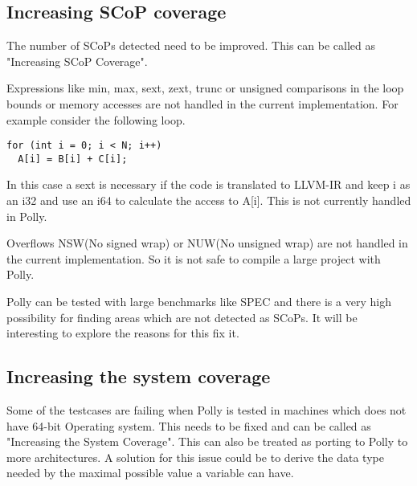 \subsection{Increasing SCoP coverage}

The number of SCoPs detected need to be improved. This can be called as "Increasing SCoP Coverage". 

Expressions like min, max, sext, zext, trunc or unsigned comparisons in the loop bounds or memory
accesses are not handled in the current implementation. For example consider the following loop.
{\footnotesize
\begin{lstlisting}
for (int i = 0; i < N; i++)
  A[i] = B[i] + C[i];
\end{lstlisting}
}
In this case a sext is necessary if the code is translated to LLVM-IR and keep i as an i32 and
use an i64 to calculate the access to A[i]. This is  not currently handled in Polly.

Overflows NSW(No signed wrap) or NUW(No unsigned wrap) are not handled in the current implementation. So
it is not safe to compile a large project with Polly.

Polly can be tested with large benchmarks like SPEC and there is a very high possibility
for finding areas which are not detected as SCoPs. It will be interesting to
explore the reasons for this fix it.
\subsection{Increasing the system coverage}

Some of the testcases are failing when Polly is tested in machines which does not
have 64-bit Operating system. This needs to be fixed and can be called as "Increasing the System Coverage".
This can also be treated as porting to Polly to more architectures.
A solution for this issue could be to derive the data type needed by the maximal possible value a variable can have.

